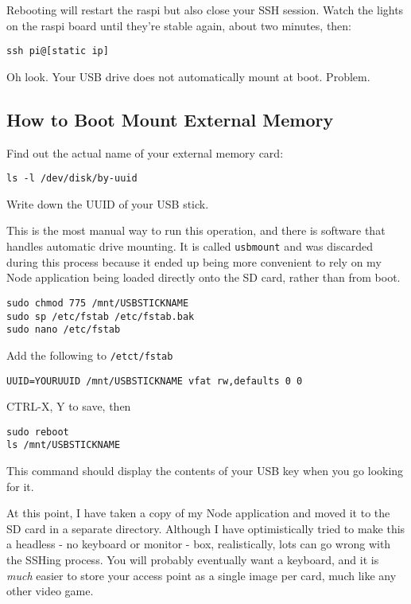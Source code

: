 Rebooting will restart the raspi but also close your SSH session. Watch the lights on the raspi board until they're stable again, about two minutes, then:
\begin{lstlisting}
ssh pi@[static ip]
\end{lstlisting}

Oh look. Your USB drive does not automatically mount at boot. Problem.

\subsection{How to Boot Mount External Memory}

Find out the actual name of your external memory card:
\begin{lstlisting}
ls -l /dev/disk/by-uuid
\end{lstlisting}

Write down the UUID of your USB stick.

This is the most manual way to run this operation, and there is software that handles automatic drive mounting. It is called \texttt{usbmount} and was discarded during this process because it ended up being more convenient to rely on my Node application being loaded directly onto the SD card, rather than from boot.

\begin{lstlisting}
sudo chmod 775 /mnt/USBSTICKNAME
sudo sp /etc/fstab /etc/fstab.bak
sudo nano /etc/fstab
\end{lstlisting}

Add the following to \texttt{/etct/fstab}
\begin{lstlisting}
UUID=YOURUUID /mnt/USBSTICKNAME vfat rw,defaults 0 0
\end{lstlisting}

CTRL-X, Y to save, then
\begin{lstlisting}
sudo reboot
ls /mnt/USBSTICKNAME
\end{lstlisting}

This command should display the contents of your USB key when you go looking for it.

At this point, I have taken a copy of my Node application and moved it to the SD card in a separate directory. Although I have optimistically tried to make this a headless - no keyboard or monitor - box, realistically, lots can go wrong with the SSHing process. You will probably eventually want a keyboard, and it is \textit{much} easier to store your access point as a single image per card, much like any other video game.

